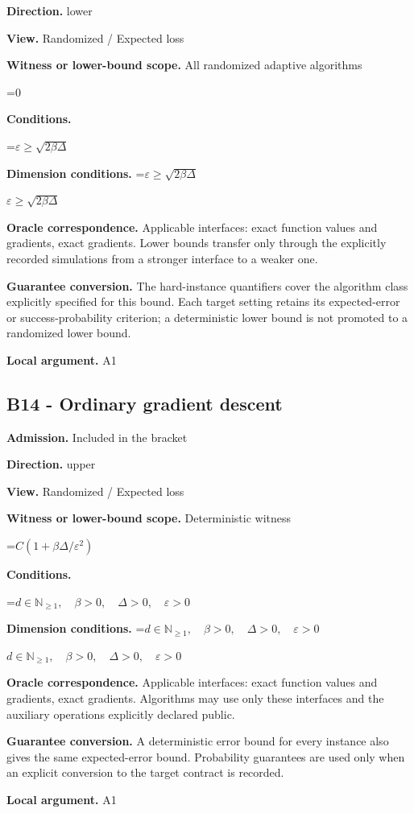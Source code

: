 \documentclass[10pt,a4paper]{article}
\newcommand{\AtlasMath}[1]{\par\begingroup\centering\setbox0=\hbox{$\displaystyle #1$}\ifdim\wd0>1.4\linewidth\typeout{ATLAS WIDE FORMULA: \the\wd0}\fi\ifdim\wd0>\linewidth\resizebox{\linewidth}{!}{\box0}\else\box0\fi\par\endgroup}
\newcommand{\AtlasInlineMath}[1]{\begingroup\setbox0=\hbox{$#1$}\ifdim\wd0>.4\linewidth\endgroup\AtlasMath{#1}\else\endgroup$#1$\fi}
\begin{document}
\textbf{Direction.} lower

\textbf{View.} Randomized / Expected loss

\textbf{Witness or lower-bound scope.} All randomized adaptive algorithms

\AtlasMath{0}
\textbf{Conditions.} 
\AtlasMath{\varepsilon\ge\sqrt{2\beta\Delta}}


\textbf{Dimension conditions.} \AtlasInlineMath{\varepsilon\ge\sqrt{2\beta\Delta}}

\textbf{Oracle correspondence.} Applicable interfaces: exact function values and gradients, exact gradients. Lower bounds transfer only through the explicitly recorded simulations from a stronger interface to a weaker one.

\textbf{Guarantee conversion.} The hard-instance quantifiers cover the algorithm class explicitly specified for this bound. Each target setting retains its expected-error or success-probability criterion; a deterministic lower bound is not promoted to a randomized lower bound.

\textbf{Local argument.} A1

\subsection{B14 - Ordinary gradient descent}
\textbf{Admission.} Included in the bracket

\textbf{Direction.} upper

\textbf{View.} Randomized / Expected loss

\textbf{Witness or lower-bound scope.} Deterministic witness

\AtlasMath{C(1+\beta\Delta/\varepsilon^2)}
\textbf{Conditions.} 
\AtlasMath{d\in\mathbb{N}_{\ge1},\quad \beta>0,\quad \Delta>0,\quad \varepsilon>0}


\textbf{Dimension conditions.} \AtlasInlineMath{d\in\mathbb{N}_{\ge1},\quad \beta>0,\quad \Delta>0,\quad \varepsilon>0}

\textbf{Oracle correspondence.} Applicable interfaces: exact function values and gradients, exact gradients. Algorithms may use only these interfaces and the auxiliary operations explicitly declared public.

\textbf{Guarantee conversion.} A deterministic error bound for every instance also gives the same expected-error bound. Probability guarantees are used only when an explicit conversion to the target contract is recorded.

\textbf{Local argument.} A1
\end{document}
